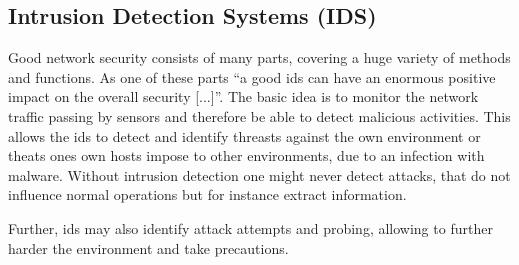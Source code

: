 

\subsection{Intrusion Detection Systems (IDS)}
\label{sec:background:network:ids}

Good network security consists of many parts, covering a huge variety of methods and functions. 
As one of these parts \enquote{a good \gls{ids} can have an enormous positive impact on the overall security [...]}. \parencite{Northcutt2005}
The basic idea is to monitor the network traffic passing by sensors and therefore be able to detect malicious activities.
This allows the \gls{ids} to detect and identify threasts against the own environment or theats ones own hosts impose to other environments, due to an infection with malware.
Without intrusion detection one might never detect attacks, that do not influence normal operations but for instance extract information.

Further, \gls{ids} may also identify attack attempts and probing, allowing to further harder the environment and take precautions.

